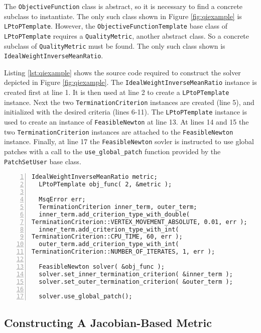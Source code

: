 \documentclass{article}
\begin{document}
The \texttt{ObjectiveFunction} class is abstract, so it is necessary to find a concrete subclass to instantiate.  The only such class shown in Figure \ref{fig:qiexample} is \texttt{LPtoPTemplate}.  However, the \texttt{ObjectiveFunctionTemplate} base class of \texttt{LPtoPTemplate} requires a \texttt{QualityMetric}, another abstract class.  So a concrete subclass of \texttt{QualityMetric} must be found.  The only such class shown is \texttt{IdealWeightInverseMeanRatio}.  

Listing \ref{lst:qiexample} shows the source code required to construct the solver depicted in Figure \ref{fig:qiexample}.  The \texttt{IdealWeightInverseMeanRatio} instance is created first at line 1.  It is then used at line 2 to create a \texttt{LPtoPTemplate} instance.  Next the two \texttt{TerminationCriterion} instances are created (line 5), and initialized with the desired criteria (lines 6-11).  The \texttt{LPtoPTemplate} instance is used to create an instance of \texttt{FeasibleNewton} at line 13.  At lines 14 and 15 the two \texttt{TerminationCriterion} instances are attached to the \texttt{FeasibleNewton} instance.  Finally, at line 17 the \texttt{FeasibleNewton} sovler is instructed to use global patches with a call to the \texttt{use\_global\_patch} function provided by the \texttt{PatchSetUser} base class.

\begin{lstlisting}[caption={Example Quality Improver},label={lst:qiexample},numbers=left] 
  IdealWeightInverseMeanRatio metric;
  LPtoPTemplate obj_func( 2, &metric );
  
  MsqError err;
  TerminationCriterion inner_term, outer_term;
  inner_term.add_criterion_type_with_double( 
TerminationCriterion::VERTEX_MOVEMENT_ABSOLUTE, 0.01, err );
  inner_term.add_criterion_type_with_int( 
TerminationCriterion::CPU_TIME, 60, err );
  outer_term.add_criterion_type_with_int( 
TerminationCriterion::NUMBER_OF_ITERATES, 1, err );

  FeasibleNewton solver( &obj_func );
  solver.set_inner_termination_criterion( &inner_term );
  solver.set_outer_termination_criterion( &outer_term );
  
  solver.use_global_patch();
\end{lstlisting}

\subsection{Constructing A Jacobian-Based Metric}
\end{document}
